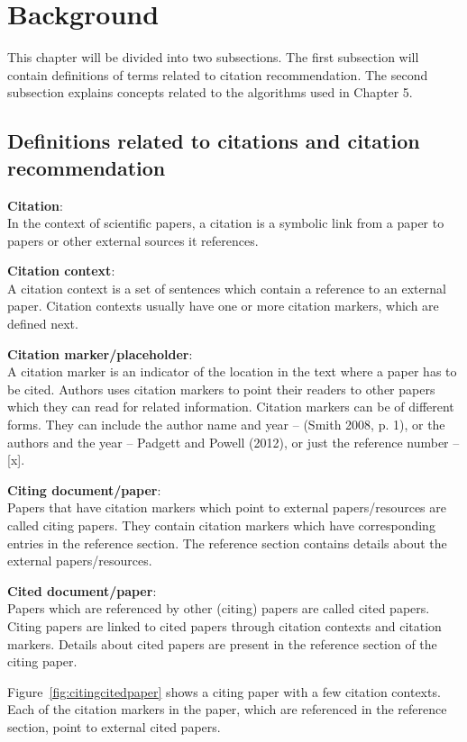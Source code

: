 \chapter{Background}\label{chap:background}
This chapter will be divided into two subsections. The first subsection will contain definitions of terms related to citation recommendation. The second subsection explains concepts related to the algorithms used in Chapter 5.

\section{Definitions related to citations and citation recommendation}

\textbf{Citation}: \\
In the context of scientific papers, a citation is a symbolic link from a paper to papers or other external sources it references.

\textbf{Citation context}:\\
A citation context is a set of sentences which contain a reference to an external paper. Citation contexts usually have one or more citation markers, which are defined next.

\textbf{Citation marker/placeholder}: \\
A citation marker is an indicator of the location in the text where a paper has to be cited. Authors uses citation markers to point their readers to other papers which they can read for related information.
Citation markers can be of different forms. They can include the author name and year -- (Smith 2008, p. 1), or the authors and the year -- Padgett and Powell (2012), or just the reference number -- [x].

\textbf{Citing document/paper}:\\
Papers that have citation markers which point to external papers/resources are called citing papers. They contain citation markers which have corresponding entries in the reference section. The reference section contains details about the external papers/resources.

\textbf{Cited document/paper}:\\
Papers which are referenced by other (citing) papers are called cited papers. Citing papers are linked to cited papers through citation contexts and citation markers. Details about cited papers are present in the reference section of the citing paper.

Figure~\ref{fig:citingcitedpaper} shows a citing paper with a few citation contexts. Each of the citation markers in the paper, which are referenced in the reference section, point to external cited papers. 

